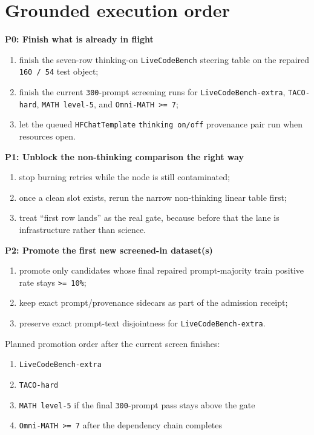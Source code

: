 \documentclass[11pt]{article}
\begin{document}
\section*{Grounded execution order}
\textbf{P0: Finish what is already in flight}
\begin{enumerate}
\item finish the seven-row thinking-on \texttt{LiveCodeBench} steering table on the repaired \texttt{160 / 54} test object;
\item finish the current \texttt{300}-prompt screening runs for \texttt{LiveCodeBench-extra}, \texttt{TACO-hard}, \texttt{MATH level-5}, and \texttt{Omni-MATH >= 7};
\item let the queued \texttt{HFChatTemplate} \texttt{thinking on/off} provenance pair run when resources open.
\end{enumerate}

\textbf{P1: Unblock the non-thinking comparison the right way}
\begin{enumerate}
\item stop burning retries while the node is still contaminated;
\item once a clean slot exists, rerun the narrow non-thinking linear table first;
\item treat ``first row lands'' as the real gate, because before that the lane is infrastructure rather than science.
\end{enumerate}

\textbf{P2: Promote the first new screened-in dataset(s)}
\begin{enumerate}
\item promote only candidates whose final repaired prompt-majority train positive rate stays \texttt{>= 10\%};
\item keep exact prompt/provenance sidecars as part of the admission receipt;
\item preserve exact prompt-text disjointness for \texttt{LiveCodeBench-extra}.
\end{enumerate}

Planned promotion order after the current screen finishes:
\begin{enumerate}
\item \texttt{LiveCodeBench-extra}
\item \texttt{TACO-hard}
\item \texttt{MATH level-5} if the final \texttt{300}-prompt pass stays above the gate
\item \texttt{Omni-MATH >= 7} after the dependency chain completes
\end{enumerate}
\end{document}
